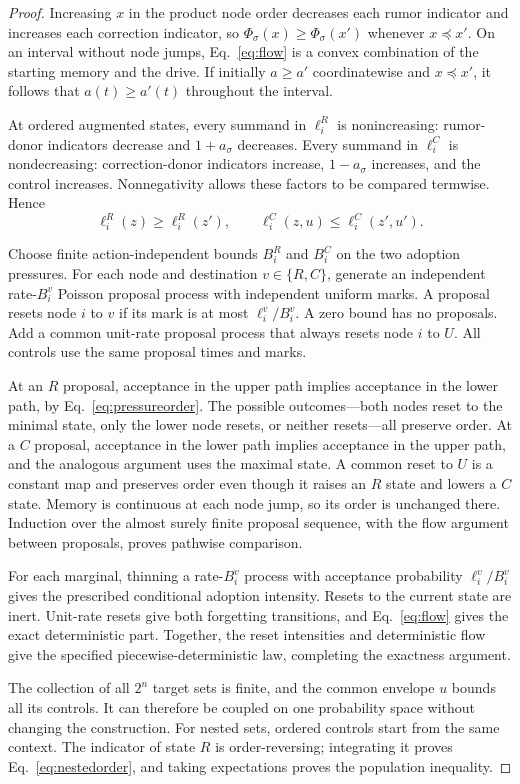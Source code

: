 \documentclass[final,5p,times,twocolumn,sort&compress]{elsarticle}
\theoremstyle{plain}
\begin{document}
\begin{proof}
Increasing $x$ in the product node order decreases each rumor indicator and increases each correction indicator, so $\Phi_\sigma(x)\ge\Phi_\sigma(x')$ whenever $x\preceq x'$. On an interval without node jumps, Eq.~\ref{eq:flow} is a convex combination of the starting memory and the drive. If initially $a\ge a'$ coordinatewise and $x\preceq x'$, it follows that $a(t)\ge a'(t)$ throughout the interval.

At ordered augmented states, every summand in $\ell_i^R$ is nonincreasing: rumor-donor indicators decrease and $1+a_\sigma$ decreases. Every summand in $\ell_i^C$ is nondecreasing: correction-donor indicators increase, $1-a_\sigma$ increases, and the control increases. Nonnegativity allows these factors to be compared termwise. Hence
\begin{equation}
 \ell_i^R(z)\ge\ell_i^R(z'),\qquad
 \ell_i^C(z,u)\le\ell_i^C(z',u').\label{eq:pressureorder}
\end{equation}

Choose finite action-independent bounds $B_i^R$ and $B_i^C$ on the two adoption pressures. For each node and destination $v\in\{R,C\}$, generate an independent rate-$B_i^v$ Poisson proposal process with independent uniform marks. A proposal resets node $i$ to $v$ if its mark is at most $\ell_i^v/B_i^v$. A zero bound has no proposals. Add a common unit-rate proposal process that always resets node $i$ to $U$. All controls use the same proposal times and marks.

At an $R$ proposal, acceptance in the upper path implies acceptance in the lower path, by Eq.~\ref{eq:pressureorder}. The possible outcomes---both nodes reset to the minimal state, only the lower node resets, or neither resets---all preserve order. At a $C$ proposal, acceptance in the lower path implies acceptance in the upper path, and the analogous argument uses the maximal state. A common reset to $U$ is a constant map and preserves order even though it raises an $R$ state and lowers a $C$ state. Memory is continuous at each node jump, so its order is unchanged there. Induction over the almost surely finite proposal sequence, with the flow argument between proposals, proves pathwise comparison.

For each marginal, thinning a rate-$B_i^v$ process with acceptance probability $\ell_i^v/B_i^v$ gives the prescribed conditional adoption intensity. Resets to the current state are inert. Unit-rate resets give both forgetting transitions, and Eq.~\ref{eq:flow} gives the exact deterministic part. Together, the reset intensities and deterministic flow give the specified piecewise-deterministic law, completing the exactness argument.

The collection of all $2^n$ target sets is finite, and the common envelope $u$ bounds all its controls. It can therefore be coupled on one probability space without changing the construction. For nested sets, ordered controls start from the same context. The indicator of state $R$ is order-reversing; integrating it proves Eq.~\ref{eq:nestedorder}, and taking expectations proves the population inequality.
\end{proof}
\end{document}
